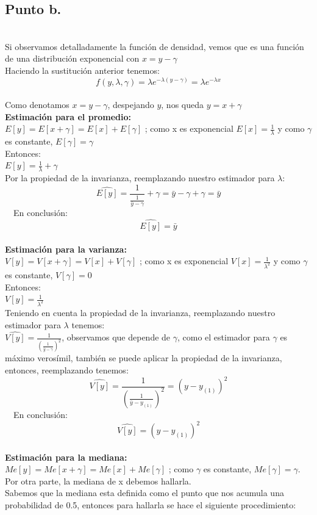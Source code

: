 \documentclass[letterpaper,12pt,onecolumn,titlepage]{article}
\begin{document}
\subsection{Punto b.} 
~\\ Si observamos detalladamente la funci\'{o}n de densidad, vemos que es una funci\'{o}n de una distribuci\'{o}n exponencial con $x=y-\gamma$
~\\ Haciendo la sustituci\'{o}n anterior tenemos:
$$f(y,\lambda,\gamma)=\lambda e^{-\lambda(y-\gamma)}=\lambda e^{-\lambda x}$$
~\\ Como denotamos $x=y-\gamma$, despejando $y$, nos queda $y=x+\gamma$
~\\ \textbf{Estimaci\'{o}n para el promedio:}
~\\ $E[y]=E[x+\gamma]=E[x]+E[\gamma]$ ; como x es exponencial $E[x]=\frac{1}{\lambda}$ y como $\gamma$ es constante, $E[\gamma]=\gamma$
~\\ Entonces:
~\\ $E[y]=\frac{1}{\lambda}+\gamma$
~\\ Por la propiedad de la invarianza, reemplazando nuestro estimador para $\lambda$:
$$\hat{E[y]}=\frac{1}{\frac{1}{\bar{y}-\gamma}}+\gamma=\bar{y}-\gamma+\gamma=\bar{y}$$
~\ En conclusi\'{o}n:
$$\hat{E[y]}=\bar{y}$$
~\\ \textbf{Estimaci\'{o}n para la varianza:}
~\\ $V[y]=V[x+\gamma]=V[x]+V[\gamma]$ ; como x es exponencial $V[x]=\frac{1}{\lambda^2}$ y como $\gamma$ es constante, $V[\gamma]=0$
~\\ Entonces:
~\\ $V[y]=\frac{1}{\lambda^2}$
~\\ Teniendo en cuenta la propiedad de la invarianza, reemplazando nuestro estimador para $\lambda$ tenemos:
~\\ $\hat{V[y]}=\frac{1}{(\frac{1}{\bar{y}-\gamma})^2}$, observamos que depende de $\gamma$, como el estimador para $\gamma$ es m\'{a}ximo veros\'{i}mil, tambi\'{e}n se puede aplicar la propiedad de la invarianza, entonces, reemplazando tenemos:
~\\ $$\hat{V[y]}=\frac{1}{(\frac{1}{\bar{y}-y_{(1)}})^2}=(y-y_{(1)})^2$$
~\ En conclusi\'{o}n:
$$\hat{V[y]}=(y-y_{(1)})^2$$
~\\ \textbf{Estimaci\'{o}n para la mediana:}
~\\ $Me[y]=Me[x+\gamma]=Me[x]+Me[\gamma]$ ; como $\gamma$ es constante, $Me[\gamma]=\gamma$. Por otra parte, la mediana de x debemos hallarla.
~\\ Sabemos que la mediana esta definida como el punto que nos acumula una probabilidad de 0.5, entonces para hallarla se hace el siguiente procedimiento: 
\end{document}

